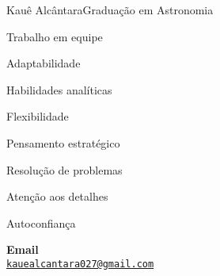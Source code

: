 \documentclass{article}
\begin{document}
\begin{cv}[fotocv]{Kauê Alcântara}{Graduação em Astronomia}
\vspace{15pt}

\begin{cvevent}[2020][2018]
\end{cvevent}

\cvsidebar %



\begin{cvitem}
    Trabalho em equipe
\end{cvitem}

\cvseparator
\begin{cvitem}
    Adaptabilidade
\end{cvitem}

\cvseparator
\begin{cvitem}
    Habilidades analíticas
\end{cvitem}

\cvseparator
\begin{cvitem}
    Flexibilidade
\end{cvitem}

\cvseparator
\begin{cvitem}
    Pensamento estratégico
\end{cvitem}

\cvseparator
\begin{cvitem}
    Resolução de problemas
\end{cvitem}

\cvseparator
\begin{cvitem}
    Atenção aos detalhes
\end{cvitem}

\cvseparator
\begin{cvitem}
    Autoconfiança
\end{cvitem}




\begin{cvitem}[Envelope][0.6]
    \textbf{Email}\\
    \href{kauealcantara027@gmail.com}{\texttt{kauealcantara027@gmail.com}}
\end{cvitem}


\end{cv}
\end{document}

